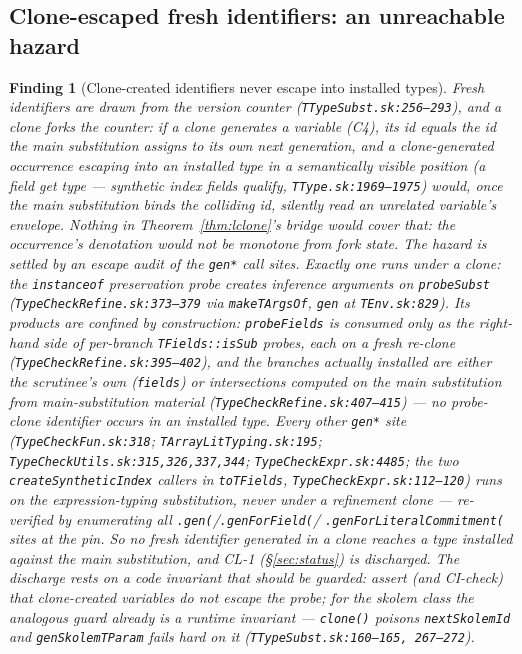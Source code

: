\documentclass[11pt]{article}
\newtheorem{finding}[theorem]{Finding}
\begin{document}
\subsection{Clone-escaped fresh identifiers: an unreachable hazard}

\begin{finding}[Clone-created identifiers never escape into installed
types]
\label{find:clone-gen}
Fresh identifiers are drawn from the \emph{version counter}
(\texttt{TTypeSubst.sk:256--293}), and a clone forks the counter: if a
clone generates a variable (C4), its id equals the id the
\emph{main} substitution assigns to its own next generation, and a
clone-generated occurrence escaping into an installed type in a
semantically visible position (a field get type — synthetic index fields
qualify, \texttt{TType.sk:1969--1975}) would, once the main substitution
binds the colliding id, silently read an unrelated variable's envelope.
Nothing in Theorem~\ref{thm:lclone}'s bridge would cover that: the
occurrence's denotation would not be monotone from fork state. The
hazard is settled by an escape audit of the \texttt{gen*} call sites.
Exactly one runs under a clone: the \texttt{instanceof} preservation
probe creates inference arguments on \texttt{probeSubst}
(\texttt{TypeCheckRefine.sk:373--379} via \texttt{makeTArgsOf},
\texttt{gen} at \texttt{TEnv.sk:829}). Its products are confined by
construction: \texttt{probeFields} is consumed only as the
right-hand side of per-branch \texttt{TFields::isSub} probes, each on a
fresh re-clone (\texttt{TypeCheckRefine.sk:395--402}), and the branches
actually \emph{installed} are either the scrutinee's own
(\texttt{fields}) or intersections computed on the main substitution
from main-substitution material
(\texttt{TypeCheckRefine.sk:407--415}) — no probe-clone identifier
occurs in an installed type. Every other \texttt{gen*} site
(\texttt{TypeCheckFun.sk:318}; \texttt{TArrayLitTyping.sk:195};
\texttt{TypeCheckUtils.sk:315,326,337,344};
\texttt{TypeCheckExpr.sk:4485}; the two
\texttt{createSyntheticIndex} callers in \texttt{toTFields},
\texttt{TypeCheckExpr.sk:112--120}) runs on the expression-typing
substitution, never under a refinement clone — re-verified by
enumerating all \texttt{.gen(}/\texttt{.genForField(}/%
\texttt{.genForLiteralCommitment(} sites at the pin. So no fresh
identifier generated in a clone reaches a type installed against the main
substitution, and CL-1 (\S\ref{sec:status}) is \emph{discharged}. The
discharge rests on a code invariant that should be guarded: assert (and
CI-check) that clone-created variables do not escape the probe; for the
skolem class the analogous guard already \emph{is} a runtime invariant
— \texttt{clone()} poisons \texttt{nextSkolemId} and
\texttt{genSkolemTParam} fails hard on it
(\texttt{TTypeSubst.sk:160--165, 267--272}).
\end{finding}
\end{document}
